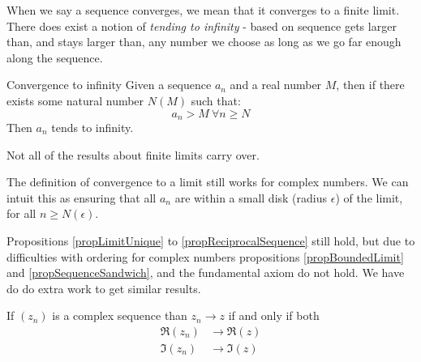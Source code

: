 \documentclass[../Main.tex]{subfiles}
\begin{document}
\begin{remark}
    When we say a sequence converges, we mean that it converges to a finite limit. There does exist a notion of \textit{tending to infinity} - based on sequence gets larger than, and stays larger than, any number we choose as long as we go far enough along the sequence.
\end{remark}
\begin{definition}{Convergence to infinity}
    Given a sequence $a_n$ and a real number $M$, then if there exists some natural number $N(M)$ such that:
    \begin{equation*}
        a_n > M~\forall n \geq N
    \end{equation*}
    Then $a_n$ tends to infinity.
\end{definition}
\begin{warning}
    Not all of the results about finite limits carry over.
\end{warning}
\begin{remark}
    The definition of convergence to a limit still works for complex numbers. We can intuit this as ensuring that all $a_n$ are within a small disk (radius $\epsilon$) of the limit, for all $n \geq N(\epsilon)$.\par
    Propositions \ref{propLimitUnique} to \ref{propReciprocalSequence} still hold, but due to difficulties with ordering for complex numbers propositions \ref{propBoundedLimit} and \ref{propSequenceSandwich}, and the fundamental axiom do not hold. We have do do extra work to get similar results.
\end{remark}
\begin{lemma}
    If $(z_n)$ is a complex sequence than $z_n \rightarrow z$ if and only if both
    \begin{align*}
        \Re(z_n) &\rightarrow \Re(z) \\
        \Im(z_n) &\rightarrow \Im(z)
    \end{align*}
\end{lemma}
\end{document}

